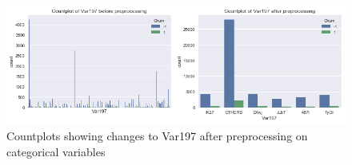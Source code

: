\documentclass{article}
\begin{document}
\begin{figure}[htbp]
\vskip 5mm
\begin{center}
\centerline{\includegraphics[width=5in]{graph/CountplotDiff.png}}
\caption{Countplots showing changes to Var197 after preprocessing on categorical variables}
\label{fig:cat_transform}
\end{center}
\vskip -5mm
\end{figure}



\end{document}
